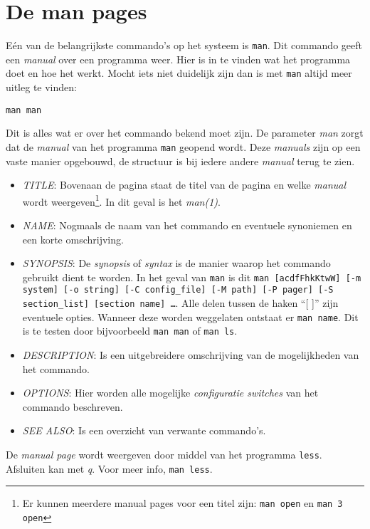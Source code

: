 \section{De man pages}\label{man}
E\'{e}n van de belangrijkste commando's op het systeem is \texttt{man}\cite{bib.man}\cite{bib.ldp}. Dit commando geeft een \emph{manual} over een programma weer. Hier is in te vinden wat het programma doet en hoe het werkt. Mocht iets niet duidelijk zijn dan is met \texttt{man} altijd meer uitleg te vinden:
\begin{lstlisting}
man man
\end{lstlisting}
Dit is alles wat er over het commando bekend moet zijn. De parameter \emph{man} zorgt dat de \emph{manual} van het programma \texttt{man} geopend wordt. Deze \emph{manuals} zijn op een vaste manier opgebouwd, de structuur is bij iedere andere \emph{manual} terug te zien. 
\begin{itemize}
  \item[1] \emph{TITLE}: Bovenaan de pagina staat de titel van de pagina en welke \emph{manual} wordt weergeven\footnote{Er kunnen meerdere manual pages voor een titel zijn: \texttt{man open} en \texttt{man 3 open}}. In dit geval is het \emph{man(1)}.
  \item[2] \emph{NAME}: Nogmaals de naam van het commando en eventuele synoniemen en een korte omschrijving.
  \item[3] \emph{SYNOPSIS}: De \emph{synopsis} of \emph{syntax} is de manier waarop het commando gebruikt dient te worden. In het geval van \texttt{man} is dit \texttt{man [acdfFhkKtwW] [-m system] [-o string] [-C config\_file] [-M path] [-P pager] [-S section\_list] [section name] \ldots}. Alle delen tussen de haken ``[ ]''  zijn eventuele opties. Wanneer deze worden weggelaten ontstaat er \texttt{man name}. Dit is te testen door bijvoorbeeld \texttt{man man} of \texttt{man ls}.
  \item[4] \emph{DESCRIPTION}: Is een uitgebreidere omschrijving van de mogelijkheden van het commando.
  \item[5] \emph{OPTIONS}: Hier worden alle mogelijke \emph{configuratie switches} van het commando beschreven.
  \item[6] \emph{SEE ALSO}: Is een overzicht van verwante commando's.
\end{itemize}
De \emph{manual page} wordt weergeven door middel van het programma \texttt{less}. Afsluiten kan met \emph{q}. Voor meer info, \texttt{man less}.

